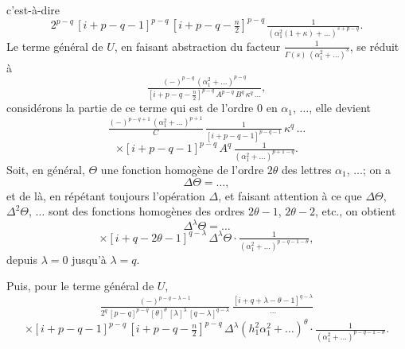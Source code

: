 \documentclass[12pt,a4paper]{article}
\begin{document}
c'est-\`a-dire
\[
2^{p - q}\,[i + p - q - 1]^{p - q}\,[i + p - q - \tfrac{n}{2}]^{p - q}\,\tfrac{1}{(\alpha_1^2(1 + \kappa) + \ldots)^{s + p - q}}.
\]
Le terme g\'en\'eral de $U$, en faisant abstraction du facteur $\tfrac{1}{\Gamma(s)\,(\alpha_1^2 + \ldots)^s}$, se r\'eduit \`a
\[
\tfrac{(-)^{p - q}\,(\alpha_1^2 + \ldots)^{p - q}}{[i + p - q - \tfrac{n}{2}]^{p - q}\,A^{p - q}\,B^q\,\kappa^q\,\ldots},
\]
consid\'erons la partie de ce terme qui est de l'ordre $0$ en $\alpha_1$, $\ldots$, elle devient
\[
\tfrac{(-)^{p - q + 1}\,(\alpha_1^2 + \ldots)^{p + 1}}{C}\,\tfrac{1}{[i + p - q - 1]^{p - q - 1}}\,\kappa^q\,\ldots
\]
\[
\times [i + p - q - 1]^{p - q}\,A^q\,\tfrac{1}{(\alpha_1^2 + \ldots)^{p + 1 - q}}.
\]
Soit, en g\'en\'eral, $\Theta$ une fonction homog\`ene de l'ordre $2\theta$ des lettres $\alpha_1$, $\ldots$; on a
\[
\Delta\Theta = \ldots,
\]
et de l\`a, en r\'ep\'etant toujours l'op\'eration $\Delta$, et faisant attention \`a ce que $\Delta\Theta$, $\Delta^2\Theta$, $\ldots$ sont des fonctions homog\`enes des ordres $2\theta - 1$, $2\theta - 2$, etc., on obtient
\[
\Delta^\lambda\Theta = \ldots
\]
\[
\times [i + q - 2\theta - 1]^{q - \lambda}\,\Delta^\lambda\Theta \cdot \tfrac{1}{(\alpha_1^2 + \ldots)^{p - q - 1 - \theta}},
\]
depuis $\lambda = 0$ jusqu'\`a $\lambda = q$.

Puis, pour le terme g\'en\'eral de $U$,
\[
\tfrac{(-)^{p - q - \lambda - 1}}{2^q\,[p - q]^{p - q}\,[\theta]^\theta\,[\lambda]^\lambda\,[q - \lambda]^{q - \lambda}}\,\tfrac{[i + q + \lambda - \theta - 1]^{q - \lambda}}{\ldots}
\]
\[
\times [i + p - q - 1]^{p - q}\,[i + p - q - \tfrac{n}{2}]^{p - q}\,\Delta^\lambda(h_1^2\alpha_1^2 + \ldots)^\theta \cdot \tfrac{1}{(\alpha_1^2 + \ldots)^{p - q - 1 - \theta}}.
\]
\end{document}

